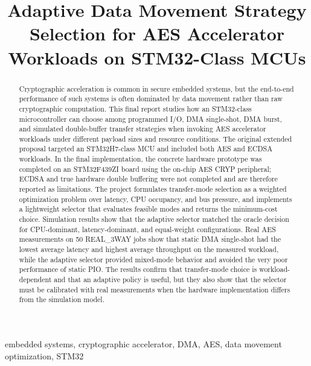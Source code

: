 \documentclass[conference]{IEEEtran}
\begin{document}
\title{Adaptive Data Movement Strategy Selection for AES Accelerator Workloads on STM32-Class MCUs}

\author{
}

\maketitle

\begin{abstract}
Cryptographic acceleration is common in secure embedded systems, but the end-to-end performance of such systems is often dominated by data movement rather than raw cryptographic computation. This final report studies how an STM32-class microcontroller can choose among programmed I/O, DMA single-shot, DMA burst, and simulated double-buffer transfer strategies when invoking AES accelerator workloads under different payload sizes and resource conditions. The original extended proposal targeted an STM32H7-class MCU and included both AES and ECDSA workloads. In the final implementation, the concrete hardware prototype was completed on an STM32F439ZI board using the on-chip AES CRYP peripheral; ECDSA and true hardware double buffering were not completed and are therefore reported as limitations. The project formulates transfer-mode selection as a weighted optimization problem over latency, CPU occupancy, and bus pressure, and implements a lightweight selector that evaluates feasible modes and returns the minimum-cost choice. Simulation results show that the adaptive selector matched the oracle decision for CPU-dominant, latency-dominant, and equal-weight configurations. Real AES measurements on 50 REAL\_3WAY jobs show that static DMA single-shot had the lowest average latency and highest average throughput on the measured workload, while the adaptive selector provided mixed-mode behavior and avoided the very poor performance of static PIO. The results confirm that transfer-mode choice is workload-dependent and that an adaptive policy is useful, but they also show that the selector must be calibrated with real measurements when the hardware implementation differs from the simulation model.
\end{abstract}

\begin{IEEEkeywords}
embedded systems, cryptographic accelerator, DMA, AES, data movement optimization, STM32
\end{IEEEkeywords}
\end{document}
